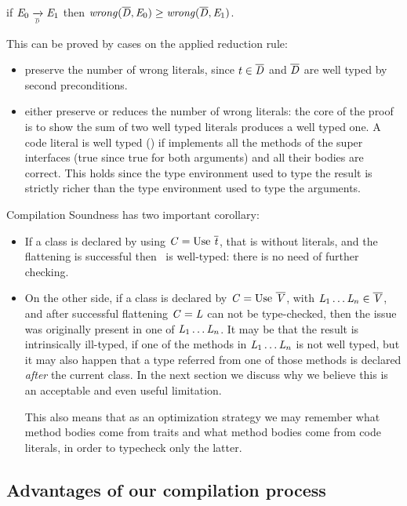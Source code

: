 \begin{Theorem}

if $\mE_0 \xrightarrow[\smallDs]{} \mE_1$
then $\mathit{wrong}(\overline{\mathit{D}},\mathit{E}_0)\geq\mathit{wrong}(\overline{\mathit{D}},\mathit{E}_1)$.
\end{Theorem}
This can be proved by cases on the applied reduction rule:
\begin{itemize}
\item
{} preserve the number of wrong literals,
since $t \in \overline{\mathit{D}}$ and $\overline{\mathit{D}}$ are well typed by  second preconditions.
\item {} either preserve or reduces the number of
wrong literals:
the core of the proof is to show the sum of two well typed literals produces a well typed one.
A code literal is well typed () if implements all the methods of the super interfaces (true since true for both arguments) and all their bodies are correct.
This holds since the type environment used to type the result is strictly richer than the type environment used to type the arguments.
\end{itemize}
\noindent 
Compilation Soundness has two important corollary:
\begin{itemize}
\item If a class is declared by using $\mC = \use\ \overline\mt$, that is without literals,
and the flattening is successful then \mC\ is well-typed: there is no need of further checking.
\item On the other side, if a class is declared by $\mC = \use\ \overline\mV$, with
$\mathit{L}_1\ldots\mathit{L}_n \in \overline{\mathit{V}}$, and after successful flattening $\mathit{C} = \mathit{L}$ can not be type-checked,
then the issue was originally present in one of $\mathit{L}_1\ldots\mathit{L}_n$.
It may be that the result is intrinsically ill-typed, if one of the methods in $\mathit{L}_1\ldots\mathit{L}_n$ is not well typed,
but it may also happen that a type referred from one of those methods
is declared \emph{after} the current class. 
In the next section we discuss why we believe this is an acceptable and even useful limitation.

This also means that as an optimization strategy
 we may remember what method bodies come from traits and what method bodies come from code literals, in order to typecheck only the latter.
 \end{itemize}






\subsection{Advantages of our compilation process}


